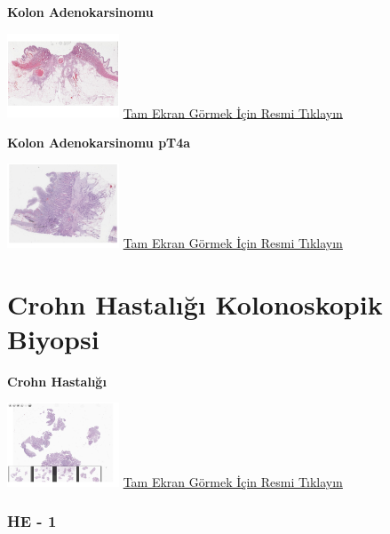 \documentclass[
  letterpaper,
  DIV=11,
  numbers=noendperiod]{scrreprt}
\begin{document}
\textbf{Kolon Adenokarsinomu}

\href{https://images.patolojiatlasi.com/colon-adenocarcinoma/HE2.html}{\includegraphics[width=0.25\textwidth,height=\textheight]{./screenshots/colon-adenocarcinoma-2_screenshot.png}}
\href{https://images.patolojiatlasi.com/colon-adenocarcinoma/HE2.html}{Tam
Ekran Görmek İçin Resmi Tıklayın}

\textbf{Kolon Adenokarsinomu pT4a}

\href{https://images.patolojiatlasi.com/colon-adenocarcinoma/HE3.html}{\includegraphics[width=0.25\textwidth,height=\textheight]{./screenshots/colon-adenocarcinoma-3_screenshot.png}}
\href{https://images.patolojiatlasi.com/colon-adenocarcinoma/HE3.html}{Tam
Ekran Görmek İçin Resmi Tıklayın}

\hypertarget{sec-crohn-colonoscopic-biopsy}{%
\chapter{Crohn Hastalığı Kolonoskopik
Biyopsi}\label{sec-crohn-colonoscopic-biopsy}}

\textbf{Crohn Hastalığı}

\href{https://images.patolojiatlasi.com/crohn-colonoscopic-biopsy/all.html}{\includegraphics[width=0.25\textwidth,height=\textheight]{./screenshots/crohn-colonoscopic-biopsy-all_screenshot.png}}
\href{https://images.patolojiatlasi.com/crohn-colonoscopic-biopsy/all.html}{Tam
Ekran Görmek İçin Resmi Tıklayın}

\hypertarget{he---1}{%
\subsection{HE - 1}\label{he---1}}
\end{document}
